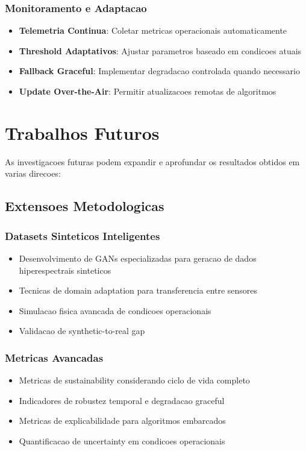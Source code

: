 \subsubsection{Monitoramento e Adaptacao}
\begin{itemize}
    \item \textbf{Telemetria Continua}: Coletar metricas operacionais automaticamente
    \item \textbf{Threshold Adaptativos}: Ajustar parametros baseado em condicoes atuais
    \item \textbf{Fallback Graceful}: Implementar degradacao controlada quando necessario
    \item \textbf{Update Over-the-Air}: Permitir atualizacoes remotas de algoritmos
\end{itemize}

\section{Trabalhos Futuros}\label{sec:trabalhos_futuros}

As investigacoes futuras podem expandir e aprofundar os resultados obtidos em varias direcoes:

\subsection{Extensoes Metodologicas}

\subsubsection{Datasets Sinteticos Inteligentes}
\begin{itemize}
    \item Desenvolvimento de GANs especializadas para geracao de dados hiperespectrais sinteticos
    \item Tecnicas de domain adaptation para transferencia entre sensores
    \item Simulacao fisica avancada de condicoes operacionais
    \item Validacao de synthetic-to-real gap
\end{itemize}

\subsubsection{Metricas Avancadas}
\begin{itemize}
    \item Metricas de sustainability considerando ciclo de vida completo
    \item Indicadores de robustez temporal e degradacao graceful
    \item Metricas de explicabilidade para algoritmos embarcados
    \item Quantificacao de uncertainty em condicoes operacionais
\end{itemize}

